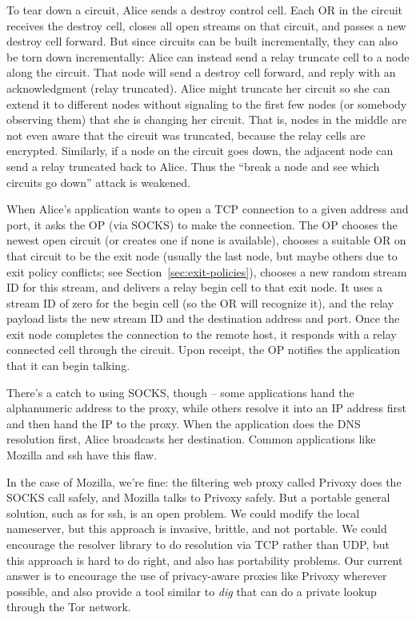 \documentclass[times,10pt,twocolumn]{article}
\begin{document}
To tear down a circuit, Alice sends a destroy control cell. Each OR
in the circuit receives the destroy cell, closes all open streams on
that circuit, and passes a new destroy cell forward. But since circuits
can be built incrementally, they can also be torn down incrementally:
Alice can instead send a relay truncate cell to a node along the circuit. That
node will send a destroy cell forward, and reply with an acknowledgment
(relay truncated). Alice might truncate her circuit so she can extend it
to different nodes without signaling to the first few nodes (or somebody
observing them) that she is changing her circuit. That is, nodes in the
middle are not even aware that the circuit was truncated, because the
relay cells are encrypted. Similarly, if a node on the circuit goes down,
the adjacent node can send a relay truncated back to Alice. Thus the
``break a node and see which circuits go down'' attack is weakened.

\label{subsec:tcp}

When Alice's application wants to open a TCP connection to a given
address and port, it asks the OP (via SOCKS) to make the connection. The
OP chooses the newest open circuit (or creates one if none is available),
chooses a suitable OR on that circuit to be the exit node (usually the
last node, but maybe others due to exit policy conflicts; see
Section~\ref{sec:exit-policies}), chooses a new random stream ID for
this stream,
and delivers a relay begin cell to that exit node. It uses a stream ID
of zero for the begin cell (so the OR will recognize it), and the relay
payload lists the new stream ID and the destination address and port.
Once the exit node completes the connection to the remote host, it
responds with a relay connected cell through the circuit. Upon receipt,
the OP notifies the application that it can begin talking.

There's a catch to using SOCKS, though -- some applications hand the
alphanumeric address to the proxy, while others resolve it into an IP
address first and then hand the IP to the proxy. When the application
does the DNS resolution first, Alice broadcasts her destination. Common
applications like Mozilla and ssh have this flaw.

In the case of Mozilla, we're fine: the filtering web proxy called Privoxy
does the SOCKS call safely, and Mozilla talks to Privoxy safely. But a
portable general solution, such as for ssh, is an open problem. We could
modify the local nameserver, but this approach is invasive, brittle, and
not portable. We could encourage the resolver library to do resolution
via TCP rather than UDP, but this approach is hard to do right, and also
has portability problems. Our current answer is to encourage the use of
privacy-aware proxies like Privoxy wherever possible, and also provide
a tool similar to \emph{dig} that can do a private lookup through the
Tor network.
\end{document}

